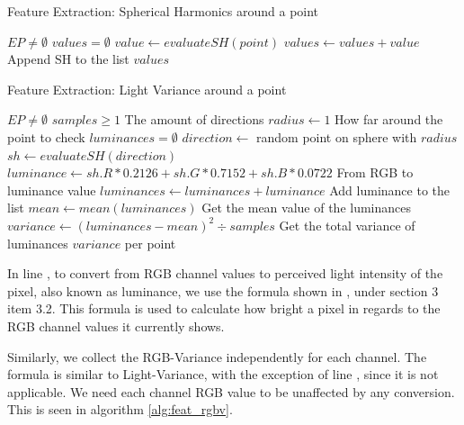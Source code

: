 \begin{algorithm}
	\caption{Feature Extraction: Spherical Harmonics around a point}
	\label{alg:feat_sh}
	\begin{algorithmic}[1]
		\Require $EP \neq \emptyset$
		\State $values = \emptyset$
			\State $value \gets evaluateSH(point)$
			\State $values \gets values + value$ \Comment Append SH to the list
		\EndFor
		\State \Return $values$
	\end{algorithmic}
\end{algorithm}

\begin{algorithm}
	\caption{Feature Extraction: Light Variance around a point}
	\label{alg:feat_lv}
	\begin{algorithmic}[1]
		\Require $EP \neq \emptyset$
		\Require $samples \geq 1$ \Comment The amount of directions
		\State $radius \gets 1$ \Comment How far around the point to check
			\State $luminances = \emptyset$
				\State $direction \gets$ random point on sphere with $radius$
				\State $sh \gets evaluateSH(direction)$
				\State $luminance \gets sh.R * 0.2126 + sh.G * 0.7152 + sh.B * 0.0722$ \Comment From RGB to luminance value
				\label{alg:feat_lv:7}
				\State $luminances \gets luminances + luminance$ \Comment Add luminance to the list
			\EndFor
			\State $mean \gets mean(luminances)$ \Comment Get the mean value of the luminances
			\State $variance \gets (luminances - mean)^2 \div samples$ \Comment Get the total variance of luminances
		\EndFor
		\State \Return $variance$ per point
	\end{algorithmic}
\end{algorithm}

In line , to convert from RGB channel values to perceived light intensity of the pixel, also known as luminance, we use the formula shown in \cite{Luminance2015}, under section 3 item 3.2. This formula is used to calculate how bright a pixel in regards to the RGB channel values it currently shows.

Similarly, we collect the RGB-Variance independently for each channel. The formula is similar to Light-Variance, with the exception of line , since it is not applicable. We need each channel RGB value to be unaffected by any conversion. This is seen in algorithm \ref{alg:feat_rgbv}.

